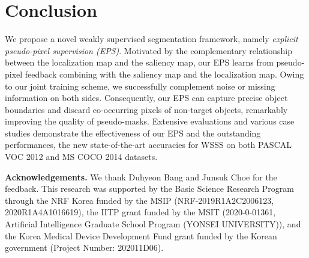 \documentclass[final]{cvpr}
\begin{document}
\section{Conclusion}
We propose a novel weakly supervised segmentation framework, namely \emph{explicit pseudo-pixel supervision (EPS)}. Motivated by the complementary relationship between the localization map and the saliency map, our EPS learns from pseudo-pixel feedback combining with the saliency map and the localization map. Owing to our joint training scheme, we successfully complement noise or missing information on both sides. Consequently, our EPS can capture precise object boundaries and discard co-occurring pixels of non-target objects, remarkably improving the quality of pseudo-masks. Extensive evaluations and various case studies demonstrate the effectiveness of our EPS and the outstanding performances, the new state-of-the-art accuracies for WSSS on both PASCAL VOC 2012 and MS COCO 2014 datasets.

\noindent\textbf{Acknowledgements. }
We thank Duhyeon Bang and Junsuk Choe for the feedback. This research was supported by the Basic Science Research Program through the NRF Korea funded by the MSIP (NRF-2019R1A2C2006123, 2020R1A4A1016619), the IITP grant funded by the MSIT (2020-0-01361, Artificial Intelligence Graduate School Program (YONSEI UNIVERSITY)), and the Korea Medical Device Development Fund grant funded by the Korean government (Project Number:  202011D06).



{\small


}
\end{document}
